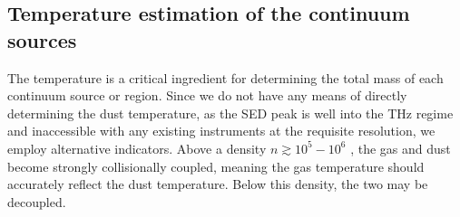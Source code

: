 \documentclass{aa}
\begin{document}


% 
% 
% 


\subsection{Temperature estimation of the continuum sources}
\label{sec:temperature}
The temperature is a critical ingredient for determining the total mass of each
continuum source or region. Since we do not have any means of directly
determining the dust temperature, as the SED peak is well into the THz regime
and inaccessible with any existing instruments at the requisite resolution, we
employ alternative indicators.  Above a density $n\gtrsim10^5-10^6$ \percc,
the gas and dust become strongly collisionally coupled, meaning the gas
temperature should accurately reflect the dust temperature.  Below this density,
the two may be decoupled.
\end{document}
